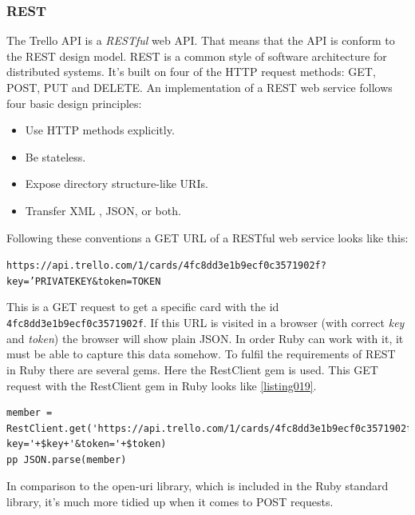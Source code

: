 \subsubsection{REST}
The Trello API is a \emph{RESTful} web API. That means that the API is conform to the REST design model. REST is a common style of software architecture for distributed systems. It's built on four of the HTTP request methods: GET, POST, PUT and DELETE. An implementation of a REST web service follows four basic design principles:
\begin{itemize}
	\item Use HTTP methods explicitly.
	\item Be stateless.
	\item Expose directory structure-like URIs.
	\item Transfer XML , JSON, or both.
\end{itemize}
\cite{rest}

Following these conventions a GET URL of a RESTful web service looks like this:
\begin{center}
\texttt{https://api.trello.com/1/cards/4fc8dd3e1b9ecf0c3571902f? key='PRIVATEKEY\&token=TOKEN}
\end{center}
This is a GET request to get a specific card with the id \texttt{4fc8dd3e1b9ecf0c3571902f}. If this URL is visited in a browser (with correct \emph{key} and \emph{token}) the browser will show plain JSON. In order Ruby can work with it, it must be able to capture this data somehow. To fulfil the requirements of REST in Ruby there are several gems. Here the RestClient gem is used. This GET request with the RestClient gem in Ruby looks like \ref{listing019}.

\begin{lstlisting}[aboveskip=1\baselineskip, caption=GET request using RestClient., label=listing019]
member = RestClient.get('https://api.trello.com/1/cards/4fc8dd3e1b9ecf0c3571902f?key='+$key+'&token='+$token)
pp JSON.parse(member)
\end{lstlisting}

In comparison to the open-uri library, which is included in the Ruby standard library, it's much more tidied up when it comes to POST requests.

